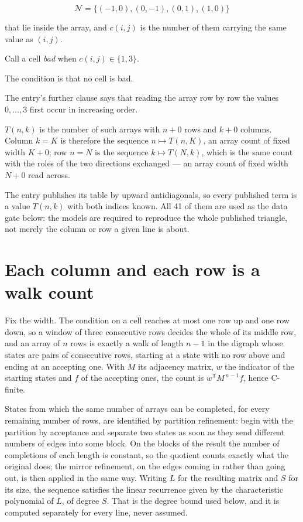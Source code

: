 \documentclass[11pt]{article}
\theoremstyle{definition}
\begin{document}
\[\mathcal{N} = \{(-1,0), (0,-1), (0,1), (1,0)\}\]

that lie inside the array, and $c(i,j)$ is the number of them carrying the same value as $(i,j)$.

Call a cell {\itshape bad} when $c(i,j) \in \{1, 3\}$.

The condition is that no cell is bad.

The entry's further clause says that reading the array row by row the values $0,\dots,3$ first occur in increasing order.

$T(n,k)$ is the number of such arrays with $n + 0$ rows and $k + 0$ columns. Column $k = K$ is therefore the sequence $n \mapsto T(n,K)$, an array count of fixed width $K + 0$; row $n = N$ is the sequence $k \mapsto T(N,k)$, which is the same count with the roles of the two directions exchanged --- an array count of fixed width $N + 0$ read across.

The entry publishes its table by upward antidiagonals, so every published term is a value $T(n,k)$ with both indices known. All 41 of them are used as the data gate below: the models are required to reproduce the whole published triangle, not merely the column or row a given line is about.

\section{Each column and each row is a walk count}

Fix the width. The condition on a cell reaches at most one row up and one row down, so a window of three consecutive rows decides the whole of its middle row, and an array of $n$ rows is exactly a walk of length $n-1$ in the digraph whose states are pairs of consecutive rows, starting at a state with no row above and ending at an accepting one. With $M$ its adjacency matrix, $w$ the indicator of the starting states and $f$ of the accepting ones, the count is $w^{\mathsf T}M^{\,n-1}f$, hence C-finite.

States from which the same number of arrays can be completed, for every remaining number of rows, are identified by partition refinement: begin with the partition by acceptance and separate two states as soon as they send different numbers of edges into some block. On the blocks of the result the number of completions of each length is constant, so the quotient counts exactly what the original does; the mirror refinement, on the edges coming in rather than going out, is then applied in the same way. Writing $L$ for the resulting matrix and $S$ for its size, the sequence satisfies the linear recurrence given by the characteristic polynomial of $L$, of degree $S$. That is the degree bound used below, and it is computed separately for every line, never assumed.
\end{document}
